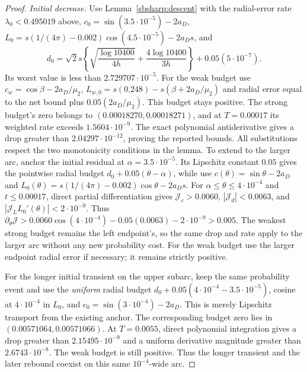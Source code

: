 \documentclass[11pt]{article}
\theoremstyle{remark}
\begin{document}
\begin{proof}
\emph{Initial decrease.}
Use Lemma~\ref{sbsharp:descent} with the radial-error rate $\lambda_0<0.495019$ above,
$c_0=\sin(3.5\cdot10^{-5})-2a_D$,
$L_0=s(1/(4\pi)-0.002)\cos(4.5\cdot10^{-5})-2a_Ds$,
and
\[
 d_0=\sqrt2s\left\{\sqrt{\frac{\log10400}{4h}}
        +\frac{4\log10400}{3h}\right\}+0.05(5\cdot10^{-7}).
\]
Its worst value is less than $2.729707\cdot10^{-5}$.
For the weak budget use
$c_w=\cos\beta-2a_D/\mu_2$,
$L_{w,0}=s(0.248)-s(\beta+2a_D/\mu_2)$ and radial error equal to the
net bound plus $0.05(2a_D/\mu_2)$. This budget stays positive.
The strong budget's zero belongs to
$(0.00018270,0.00018271)$, and at $T=0.00017$ its weighted rate exceeds
$1.5604\cdot10^{-9}$. The exact polynomial antiderivative gives a
drop greater than $2.04297\cdot10^{-12}$, proving the reported bounds.
All substitutions respect the two monotonicity conditions in the lemma.
To extend to the larger arc, anchor the initial residual at
$\alpha=3.5\cdot10^{-5}$. Its Lipschitz constant $0.05$ gives the
pointwise radial budget $d_0+0.05(\theta-\alpha)$, while use
$c(\theta)=\sin\theta-2a_D$ and
$L_0(\theta)=s(1/(4\pi)-0.002)\cos\theta-2a_Ds$.
For $\alpha\le\theta\le4\cdot10^{-4}$ and $t\le0.00017$, direct
partial differentiation gives
$\mathcal J_c>0.0060$, $|\mathcal J_d|<0.0063$, and
$|\mathcal J_L L_0'(\theta)|<2\cdot10^{-9}$.
Thus $\partial_\theta\mathcal J>0.0060\cos(4\cdot10^{-4})
-0.05(0.0063)-2\cdot10^{-9}>0.005$.
The weakest strong budget remains the left endpoint's, so the same
drop and rate apply to the larger arc without any new probability cost.
For the weak budget use the larger endpoint radial error if necessary;
it remains strictly positive.

For the longer initial transient on the upper subarc, keep the same
probability event and use the \emph{uniform} radial budget
$d_0+0.05(4\cdot10^{-4}-3.5\cdot10^{-5})$, cosine at
$4\cdot10^{-4}$ in $L_0$, and $c_0=\sin(3\cdot10^{-4})-2a_D$.
This is merely Lipschitz transport from the existing anchor.
The corresponding budget zero lies in $(0.00571064,0.00571066)$.
At $T=0.0055$, direct polynomial integration gives a drop greater than
$2.15495\cdot10^{-9}$ and a uniform derivative magnitude greater than
$2.6743\cdot10^{-8}$. The weak budget is still positive. Thus the longer
transient and the later rebound coexist on this same $10^{-4}$-wide arc.


\end{proof}
\end{document}
